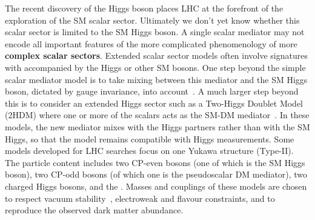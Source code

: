 


The recent discovery of the Higgs boson places LHC at the forefront of the exploration of the SM scalar sector. Ultimately we don't yet know whether this scalar sector is limited to the SM Higgs boson. A single scalar mediator may not encode all important features of the more complicated phenomenology of more \textbf{complex scalar sectors}. Extended scalar sector models often involve signatures with \MET accompanied by the Higgs or other SM bosons.
One step beyond the simple scalar mediator model is to take mixing between this mediator and the SM Higgs boson, dictated by gauge invariance, into account~\cite{Bauer:2016gys,Berlin:2014cfa}. 
A much larger step beyond this is to consider an extended Higgs sector such as a Two-Higgs Doublet Model (2HDM) where one or more of the scalars acts as the SM-DM mediator~\cite{Bauer:2017ota,Goncalves:2016iyg,Bell:2016ekl}. 
In these models, the new  mediator mixes with the Higgs partners rather than with the SM Higgs, so that the model remains compatible with Higgs measurements. Some models developed for LHC searches focus on one Yukawa structure (Type-II). The particle content includes two CP-even bosons (one of which is the SM Higgs boson), two CP-odd bosons (of which one is the pseudoscalar DM mediator), two charged Higgs bosons, and the \IP. Masses and couplings of these models are chosen to respect vacuum stability~\cite{Goncalves:2016iyg}, electroweak and flavour constraints, and to reproduce the observed dark matter abundance.


